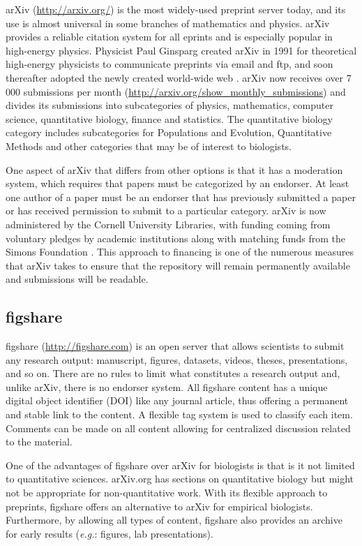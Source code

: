 \documentclass[letterpaper,twocolumn,superscriptaddress,showkeys,longbibliography]{revtex4-1}
\begin{document}
arXiv (\url{http://arxiv.org/}) is the most widely-used preprint server today,
and its use is almost universal in some branches of mathematics and physics.
arXiv provides a reliable citation system for all eprints and is especially
popular in high-energy physics. Physicist Paul Ginsparg created arXiv in 1991
for theoretical high-energy physicists to communicate preprints via email and
ftp, and soon thereafter adopted the newly created world-wide
web \cite{jackson2002preprints}.  arXiv now receives over 7 000 submissions per
month (\url{http://arxiv.org/show_monthly_submissions}) and divides its
submissions into subcategories of physics, mathematics, computer science,
quantitative biology, finance and statistics.  The quantitative biology category
includes subcategories for Populations and Evolution, Quantitative Methods and
other categories that may be of interest to biologists.

One aspect of arXiv that differs from other options is that it has a moderation
system, which requires that papers must be categorized by an endorser.
At least one author of a paper must be an endorser that has previously submitted
a paper or has received permission to submit to a particular category. arXiv is now
administered by the Cornell University Libraries, with funding coming from
voluntary pledges by academic institutions along with matching funds from the
Simons Foundation \cite{arxiv_future}. This approach to financing is one of
the numerous measures that arXiv takes to ensure that the repository will remain
permanently available and submissions will be readable.

\subsection{figshare}

figshare (\href{http://figshare.com}{http://figshare.com}) is an open server
that allows scientists to submit any research output: manuscript, figures,
datasets, videos, theses, presentations, and so on. There are no rules to limit
what constitutes a research output and, unlike arXiv, there is no endorser
system. All figshare content has a unique digital object identifier (DOI) like
any journal article, thus offering a permanent and stable link to the content.
A flexible tag system is used to classify each item. Comments can be made on all
content allowing for centralized discussion related to the material.

One of the advantages of figshare over arXiv for biologists is that is it not
limited to quantitative sciences. arXiv.org has sections on quantitative biology
but might not be appropriate for non-quantitative work. With its flexible
approach to preprints, figshare offers an alternative to arXiv for empirical
biologists. Furthermore, by allowing all types of content, figshare also
provides an archive for early results (\emph{e.g.}: figures, lab presentations).
\end{document}
